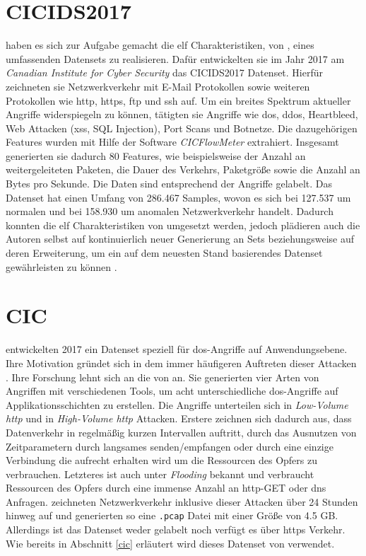 \documentclass[
    12pt, %
    DIV10,
    ngerman, %
    a4paper, %
    oneside, %
    titlepage, %
    parskip=half, %
    headings=normal, %
    listof=totoc, %
    bibliography=totoc, %
    index=totoc, %
    captions=tableheading, %
    final %
]{scrreprt}
\begin{document}
\section{CICIDS2017}
\textcite{Sharafaldin2018} haben es sich zur Aufgabe gemacht die elf Charakteristiken, von \citeauthor{7885840}, eines umfassenden Datensets  zu realisieren. Dafür entwickelten sie im Jahr 2017 am \emph{Canadian Institute for Cyber Security} das CICIDS2017 Datenset. Hierfür zeichneten sie Netzwerkverkehr mit E-Mail Protokollen sowie weiteren Protokollen wie \ac{http}, \ac{https}, \ac{ftp} und \ac{ssh} auf. Um ein breites Spektrum aktueller Angriffe widerspiegeln zu können, tätigten sie Angriffe wie \ac{dos}, \ac{ddos}, Heartbleed, Web Attacken (\ac{xss}, SQL Injection), Port Scans und Botnetze. Die dazugehörigen Features wurden mit Hilfe der Software \emph{CICFlowMeter} \parencite{Lashkari201} extrahiert. Insgesamt  generierten sie dadurch 80 Features, wie beispielsweise der Anzahl an weitergeleiteten Paketen, die Dauer des Verkehrs, Paketgröße sowie die Anzahl an Bytes pro Sekunde.
Die Daten sind entsprechend der Angriffe gelabelt. Das Datenset hat einen Umfang von 286.467 Samples, wovon es sich bei 127.537 um normalen und bei 158.930 um anomalen Netzwerkverkehr handelt. Dadurch konnten die elf Charakteristiken von \citeauthor{7885840} umgesetzt werden, jedoch plädieren auch die Autoren selbst auf kontinuierlich neuer Generierung an Sets beziehungsweise auf deren Erweiterung, um ein auf dem neuesten Stand basierendes Datenset gewährleisten zu können \parencite{Sharafaldin2018}.
\section{CIC}
\textcite{jazi2017detecting} entwickelten 2017 ein Datenset speziell für \ac{dos}-Angriffe auf Anwendungsebene. Ihre Motivation gründet sich in dem immer häufigeren Auftreten dieser Attacken \parencite{NETSCOUT}.
Ihre Forschung lehnt sich an die von \textcite{shiravi2012toward} an. Sie generierten vier Arten von Angriffen mit verschiedenen Tools, um acht unterschiedliche \ac{dos}-Angriffe auf Applikationsschichten zu erstellen. Die Angriffe unterteilen sich in \emph{Low-Volume \ac{http}} und in \emph{High-Volume \ac{http}} Attacken. Erstere zeichnen sich dadurch aus, dass Datenverkehr in regelmäßig kurzen Intervallen auftritt, durch das Ausnutzen von Zeitparametern durch langsames senden/empfangen oder durch eine einzige Verbindung die aufrecht erhalten wird um die Ressourcen  des Opfers zu verbrauchen. Letzteres ist auch unter \emph{Flooding} bekannt und verbraucht Ressourcen des Opfers durch eine immense Anzahl an \ac{http}-GET oder \ac{dns} Anfragen. \citeauthor{jazi2017detecting} zeichneten Netzwerkverkehr inklusive dieser Attacken über 24 Stunden hinweg auf und generierten so eine \texttt{.pcap} Datei mit einer Größe von 4.5 GB. Allerdings ist das Datenset weder gelabelt noch verfügt es über \ac{https} Verkehr. Wie bereits in Abschnitt \ref{cic} erläutert wird dieses Datenset von \textcite{siracusano2018detection} verwendet.
\end{document}
